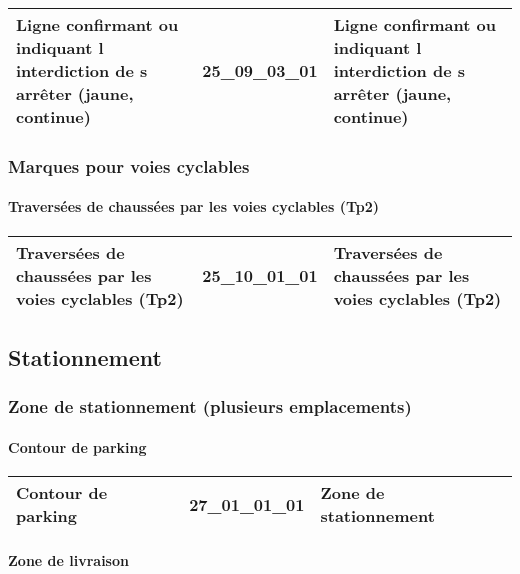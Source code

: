 \documentclass[12pt,titlepage,oneside]{book}
\begin{document}
\renewcommand{\arraystretch}{1.2}
\begin{supertabular}{|p{10cm}|c|p{15cm}|}
 Ligne confirmant ou indiquant l interdiction de s arrêter (jaune, continue) & 25\_09\_03\_01 & Ligne confirmant ou indiquant l interdiction de s arrêter (jaune, continue)\\
\hline
\end{supertabular}

\subsubsection{\large Marques pour voies cyclables}
\paragraph{Traversées de chaussées par les voies cyclables (Tp2)}
\noindent
\vspace{\baselineskip}

\renewcommand{\arraystretch}{1.2}
\begin{supertabular}{|p{10cm}|c|p{15cm}|}
 Traversées de chaussées par les voies cyclables (Tp2) & 25\_10\_01\_01 & Traversées de chaussées par les voies cyclables (Tp2)\\
\hline
\end{supertabular}
\subsection{Stationnement}
\subsubsection{\large Zone de stationnement (plusieurs emplacements)}
\paragraph{Contour de parking}
\noindent
\vspace{\baselineskip}

\renewcommand{\arraystretch}{1.2}
\begin{supertabular}{|p{10cm}|c|p{15cm}|}
 Contour de parking & 27\_01\_01\_01 & Zone de stationnement\\
\hline
\end{supertabular}


\paragraph{Zone de livraison}
\noindent
\vspace{\baselineskip}
\end{document}
